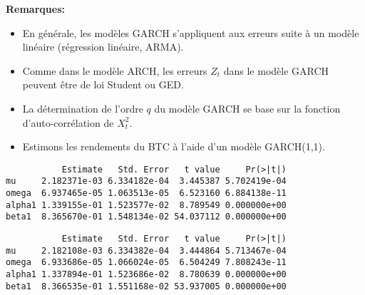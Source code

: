 \documentclass[
  ignorenonframetext,
]{beamer}
\newenvironment{Shaded}{\begin{snugshade}}{\end{snugshade}}
\newcommand{\AttributeTok}[1]{\textcolor[rgb]{0.77,0.63,0.00}{#1}}
\newcommand{\CommentTok}[1]{\textcolor[rgb]{0.56,0.35,0.01}{\textit{#1}}}
\newcommand{\DecValTok}[1]{\textcolor[rgb]{0.00,0.00,0.81}{#1}}
\newcommand{\FunctionTok}[1]{\textcolor[rgb]{0.00,0.00,0.00}{#1}}
\newcommand{\NormalTok}[1]{#1}
\newcommand{\OtherTok}[1]{\textcolor[rgb]{0.56,0.35,0.01}{#1}}
\newcommand{\SpecialCharTok}[1]{\textcolor[rgb]{0.00,0.00,0.00}{#1}}
\begin{document}
\begin{frame}
\textbf{Remarques:}

\begin{itemize}[<+->]
\item
  En générale, les modèles GARCH s'appliquent aux erreurs suite à un
  modèle linéaire (régression linéaire, ARMA).
\item
  Comme dans le modèle ARCH, les erreurs \(Z_t\) dans le modèle GARCH
  peuvent être de loi Student ou GED.
\item
  La détermination de l'ordre \(q\) du modèle GARCH se base sur la
  fonction d'auto-corrélation de \(X_t^2\).
\item
  Estimons les rendements du BTC à l'aide d'un modèle GARCH(1,1).
\end{itemize}
\end{frame}

\begin{frame}[fragile]
\begin{Shaded}
\end{Shaded}

\begin{verbatim}
           Estimate   Std. Error   t value     Pr(>|t|)
mu     2.182371e-03 6.334182e-04  3.445387 5.702419e-04
omega  6.937465e-05 1.063513e-05  6.523160 6.884138e-11
alpha1 1.339155e-01 1.523577e-02  8.789549 0.000000e+00
beta1  8.365670e-01 1.548134e-02 54.037112 0.000000e+00
\end{verbatim}

\begin{Shaded}
\end{Shaded}

\begin{verbatim}
           Estimate   Std. Error   t value     Pr(>|t|)
mu     2.182108e-03 6.334382e-04  3.444864 5.713467e-04
omega  6.933686e-05 1.066024e-05  6.504249 7.808243e-11
alpha1 1.337894e-01 1.523686e-02  8.780639 0.000000e+00
beta1  8.366535e-01 1.551168e-02 53.937005 0.000000e+00
\end{verbatim}
\end{frame}
\end{document}
